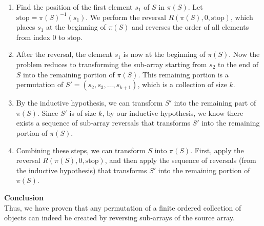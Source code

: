 \documentclass{article}
\begin{document}
    \begin{enumerate}
        \item Find the position of the first element \(s_1\) of \(S\) in \(\pi(S)\). Let \(\text{stop} = \pi(S)^{-1}(s_1)\). We perform the reversal \(R(\pi(S), 0, \text{stop})\), which places \(s_1\) at the beginning of \(\pi(S)\) and reverses the order of all elements from index 0 to \(\text{stop}\).

        \item After the reversal, the element \(s_1\) is now at the beginning of \(\pi(S)\). Now the problem reduces to transforming the sub-array starting from \(s_2\) to the end of \(S\) into the remaining portion of \(\pi(S)\). This remaining portion is a permutation of \(S' = (s_2, s_3, \ldots, s_{k+1})\), which is a collection of size \(k\).

        \item By the inductive hypothesis, we can transform \(S'\) into the remaining part of \(\pi(S)\). Since \(S'\) is of size \(k\), by our inductive hypothesis, we know there exists a sequence of sub-array reversals that transforms \(S'\) into the remaining portion of \(\pi(S)\).

        \item Combining these steps, we can transform \(S\) into \(\pi(S)\). First, apply the reversal \(R(\pi(S), 0, \text{stop})\), and then apply the sequence of reversals (from the inductive hypothesis) that transforms \(S'\) into the remaining portion of \(\pi(S)\).
    \end{enumerate}

    \textbf{Conclusion} \\
    Thus, we have proven that any permutation of a finite ordered collection of objects can indeed be created by reversing sub-arrays of the source array.
\end{document}
